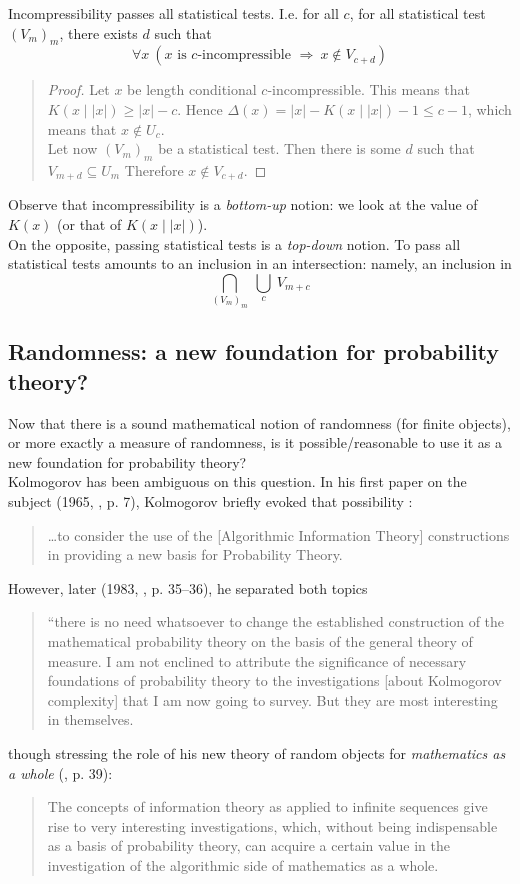 \begin{corollary}[Martin-L\"of, 1965]
Incompressibility passes all statistical tests.
I.e. for all $c$, for all statistical test $(V_m)_m$,
there exists $d$ such that
$$
\forall x\ (x\mbox{ is $c$-incompressible }
\Rightarrow\ x\notin V_{c+d})
$$
\end{corollary}
{\small\begin{quote}
\begin{proof}
Let $x$ be length conditional $c$-incompressible.
This means that $K(x\mid |x|)\geq |x|-c$.
Hence $\Delta(x)=|x|-K(x\mid|x|)-1\leq c-1$, which means that
$x\notin U_c$.
\\
Let now $(V_m)_m$ be a statistical test.
Then there is some $d$ such that $V_{m+d}\subseteq U_m$
Therefore $x\notin V_{c+d}$.
\end{proof}
\end{quote}}
\begin{remark}
Observe that incompressibility is a {\em bottom-up} notion:
we look at the value of $K(x)$ (or that of $K(x \mid |x|)$).
\\
On the opposite, passing statistical tests is a {\em top-down}
notion.
To pass all statistical tests amounts to an inclusion
in an intersection: namely, an inclusion in
$$
\bigcap_{(V_m)_m}\ \bigcup_c\ V_{m+c}
$$
\end{remark}
\subsection{Randomness: a new foundation for probability theory?}
Now that there is a sound mathematical notion of randomness
(for finite objects), or more exactly a measure of randomness,
is it possible/reasonable to use it as a new foundation for
probability theory?
\\
Kolmogorov has been ambiguous on this question.
In his first paper on the subject (1965, \cite{kolmo65}, p. 7),
Kolmogorov briefly evoked that possibility :
\begin{quote}
\dots to consider the use of the
[Algorithmic Information Theory] constructions
in providing a new basis for Probability Theory.
\end{quote}
However, later (1983, \cite{kolmo83}, p. 35--36),
he separated both topics
\begin{quote}
``there is no need whatsoever to change the
established construction of the mathematical
probability theory on the basis of the general theory
of measure.
I am not enclined to attribute the significance of
necessary foundations of probability theory to the
investigations [about Kolmogorov complexity] that
I am now going to survey.
But they are most interesting in themselves.
\end{quote}
though stressing the role of his new theory of random
objects for {\em mathematics as a whole}
(\cite{kolmo83}, p. 39):
\begin{quote}
The concepts of information theory as applied
to infinite sequences give rise to very interesting
investigations, which, without being indispensable
as a basis of probability theory, can acquire a
certain value in the investigation of the
algorithmic side of mathematics as a whole.
\end{quote}
